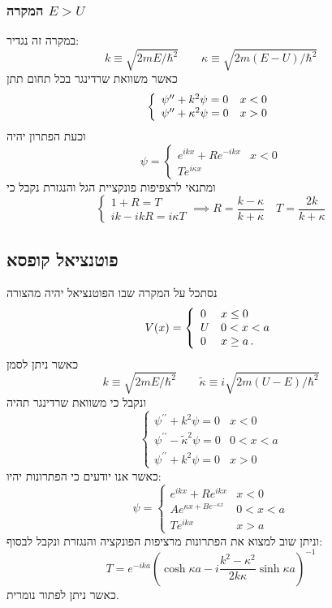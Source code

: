 \documentclass{tstextbook}
\begin{document}
\subsubsection{המקרה \(E>U\)}

במקרה זה נגדיר:
$$k\equiv\sqrt{2m E/\hbar^{2}}\qquad \kappa\equiv{\sqrt{2m(E-U)/\hbar^{2}}}$$
כאשר משוואת שרדינגר בכל תחום תתן
$$\left\{\begin{array}{l l}{{\psi^{\prime\prime}+k^{2}\psi=0}}&{{x<0}}\\ {{\psi^{\prime\prime}+\kappa^{2}\psi=0}}&{{x>0}}\end{array}\right.$$
וכעת הפתרון יהיה
$$\psi=\begin{cases}e^{ ikx }+R e^{ -ikx } & x<0 \\Te^{ i\kappa x }
\end{cases}$$
ומתנאי לרצפיפות פונקציית הגל והנגזרת נקבל כי
$$\begin{cases}1+R=T \\ik-ikR=i\kappa T
\end{cases}\implies R=\frac{k-\kappa}{k+\kappa}\quad T=\frac{2k}{k+\kappa}$$

\subsection{פוטנציאל קופסא}

נסתכל על המקרה שבו הפוטנציאל יהיה מהצורה
$$V(x)=\left\{\begin{array}{l l}{{0}}&{{x\leq0}}\\ {{U}}&{{0<x<a}}\\ {{0}}&{{x\geq a\,.}}\end{array}\right.$$
כאשר ניתן לסמן
$$k\equiv{\sqrt{2m E/\hbar^{2}}} \qquad \tilde{\kappa}\equiv i\sqrt{2m(U-E)/\hbar^{2}}$$
ונקבל כי משוואת שרדינגר תהיה
$$\begin{cases}\psi^{\prime\prime}+k^{2}\psi=0 & x< 0\\\psi^{\prime\prime}-\tilde{\kappa}^{2}\psi=0 & 0<x<a \\\psi^{\prime\prime}+k^{2}\psi=0 & x> 0
\end{cases}$$
כאשר אנו יודעים כי הפתרונות יהיו:
$$\psi=\begin{cases}e^{ ikx }+ R e^{ ikx } & x<0 \\Ae^{ \kappa x + B e^{ -\kappa x } } & 0<x<a \\Te^{ ikx } & x>a
\end{cases}$$
וניתן שוב למצוא את הפתרונות מרציפות הפונקציה והנגזרת ונקבל לבסוף:
$$T=e^{-i k a}\left(\cosh\kappa a-i\frac{k^{2}-\kappa^{2}}{2k\kappa}\sinh\kappa a\right)^{-1}$$
כאשר ניתן לפתור נומרית.
\end{document}
